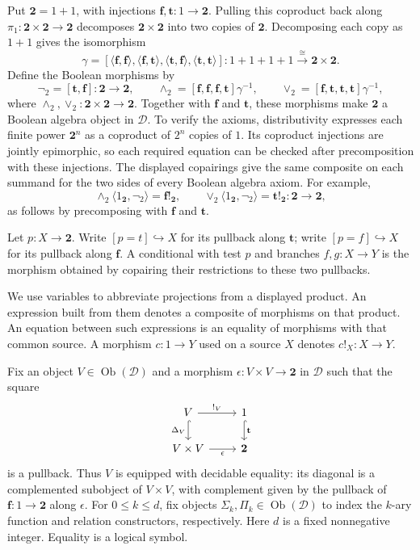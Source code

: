 \documentclass[11pt]{article}
\theoremstyle{definition}\newtheorem{definition}[theorem]{Definition}
\newcommand{\Two}{\mathbf 2}
\begin{document}
Put $\Two=1+1$, with injections
$\mathbf f,\mathbf t:1\to\Two$. Pulling this coproduct back along
$\pi_1:\Two\times\Two\to\Two$ decomposes $\Two\times\Two$ into two copies of
$\Two$. Decomposing each copy as $1+1$ gives the isomorphism
\[
 \gamma=[\langle\mathbf f,\mathbf f\rangle,
          \langle\mathbf f,\mathbf t\rangle,
          \langle\mathbf t,\mathbf f\rangle,
          \langle\mathbf t,\mathbf t\rangle]:
          1+1+1+1\xrightarrow{\cong}\Two\times\Two.
\]
Define the Boolean morphisms by
\[
 \neg_2=[\mathbf t,\mathbf f]:\Two\to\Two,\qquad
 \wedge_2=[\mathbf f,\mathbf f,\mathbf f,\mathbf t]\gamma^{-1},
 \qquad
 \vee_2=[\mathbf f,\mathbf t,\mathbf t,\mathbf t]\gamma^{-1},
\]
where $\wedge_2,\vee_2:\Two\times\Two\to\Two$.
Together with $\mathbf f$ and $\mathbf t$, these morphisms make
$\Two$ a Boolean algebra object in $\mathcal D$.
To verify the axioms, distributivity expresses each finite power
$\Two^n$ as a coproduct of $2^n$ copies of $1$.
Its coproduct injections are jointly epimorphic, so each required
equation can be checked after precomposition with these injections.
The displayed copairings give the same composite on each summand
for the two sides of every Boolean algebra axiom. For example,
\[
 \wedge_2\langle1_{\Two},\neg_2\rangle=\mathbf f!_{\Two},
 \qquad
 \vee_2\langle1_{\Two},\neg_2\rangle=\mathbf t!_{\Two}:
 \Two\to\Two,
\]
as follows by precomposing with $\mathbf f$ and $\mathbf t$.

Let $p:X\to\Two$. Write $[p=t]\hookrightarrow X$ for its
pullback along $\mathbf t$; write $[p=f]\hookrightarrow X$ for its
pullback along $\mathbf f$.
A conditional with test $p$ and branches $f,g:X\to Y$ is the
morphism obtained by copairing their restrictions to these two
pullbacks.

We use variables to abbreviate projections from a displayed product.
An expression built from them denotes a composite of morphisms on
that product. An equation between such expressions is an equality
of morphisms with that common source. A morphism $c:1\to Y$ used
on a source $X$ denotes $c!_X:X\to Y$.

Fix an object $V\in\operatorname{Ob}(\mathcal D)$ and a morphism
$\epsilon:V\times V\to\Two$ in $\mathcal D$ such that the square
\[
\begin{tikzcd}
 V\arrow[r,"{!_V}"]\arrow[d,hook,"\Delta_V"'] &
 1\arrow[d,hook,"\mathbf t"]\\
 V\times V\arrow[r,"\epsilon"'] & \Two
\end{tikzcd}
\]
is a pullback. Thus $V$ is equipped with decidable equality:
its diagonal is a complemented subobject of $V\times V$, with
complement given by the pullback of $\mathbf f:1\to\Two$
along $\epsilon$.
For $0\leq k\leq d$, fix objects
$\Sigma_k,\Pi_k\in\operatorname{Ob}(\mathcal D)$ to index the
$k$-ary function and relation constructors, respectively.
Here $d$ is a fixed nonnegative integer. Equality is a logical symbol.
\end{document}

